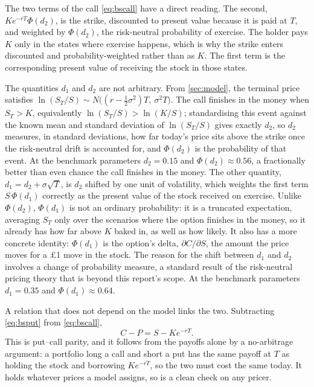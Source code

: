 \documentclass[11pt,a4paper]{article}
\numberwithin{equation}{section}
\theoremstyle{definition}
\theoremstyle{plain}
\theoremstyle{remark}
\begin{document}
The two terms of the call \eqref{eq:bscall} have a direct reading. The second,
$K e^{-rT}\Phi(d_2)$, is the strike, discounted to present value because it is
paid at $T$, and weighted by $\Phi(d_2)$, the risk-neutral probability of
exercise. The holder pays $K$ only in the states where exercise
happens, which is why the strike enters discounted and probability-weighted
rather than as $K$. The first term is the corresponding present value of
receiving the stock in those states.

The quantities $d_1$ and $d_2$ are not arbitrary. From
\cref{sec:model}, the terminal price satisfies
$\ln(S_T/S) \sim N\!\big((r-\tfrac{1}{2}\sigma^2)T,\ \sigma^2 T\big)$. The call
finishes in the money when $S_T > K$, equivalently $\ln(S_T/S) > \ln(K/S)$;
standardising this event against the known mean and
standard deviation of $\ln(S_T/S)$ gives exactly $d_2$, so $d_2$ measures, in
standard deviations, how far today's price sits above the strike once the
risk-neutral drift is accounted for, and $\Phi(d_2)$ is the
probability of that event. At the benchmark parameters $d_2 = 0.15$ and
$\Phi(d_2) \approx 0.56$, a fractionally better than even chance the call
finishes in the money. The other quantity,
$d_1 = d_2 + \sigma\sqrt{T}$, is $d_2$ shifted by one unit of
volatility, which weights the first term $S\,\Phi(d_1)$ correctly as the
present value of the stock received on exercise. Unlike $\Phi(d_2)$,
$\Phi(d_1)$ is not an ordinary probability: it is a truncated expectation,
averaging $S_T$ only over the scenarios where the option finishes in the
money, so it already has how far above $K$ baked in, as well as how likely. It
also has a more concrete identity: $\Phi(d_1)$ is the option's
delta, $\partial C/\partial S$, the amount the price moves for a
£1 move in the stock. The reason for the shift between $d_1$ and
$d_2$ involves a change of probability measure, a standard result of the
risk-neutral pricing theory that is beyond this report's scope. At the
benchmark parameters $d_1 = 0.35$ and
$\Phi(d_1) \approx 0.64$.

A relation that does not depend on the model links the two. Subtracting
\eqref{eq:bsput} from \eqref{eq:bscall},
\begin{equation}\label{eq:parity}
  C - P = S - K e^{-rT}.
\end{equation}
This is put--call parity, and it follows from the payoffs alone by a no-arbitrage
argument: a portfolio long a call and short a put has the same payoff at $T$ as
holding the stock and borrowing $K e^{-rT}$, so the two must cost the same today.
It holds whatever prices a model assigns, so is a clean check on any pricer.
\end{document}

